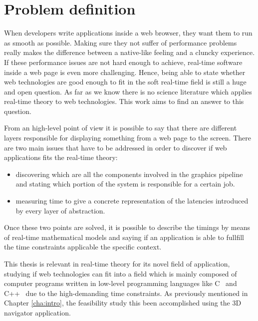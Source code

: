 \chapter{Problem definition} \label{cha:problem_definition}

When developers write applications inside a web browser, they want them to run
as smooth as possible. Making sure they not suffer of performance problems really
makes the difference between a native-like feeling and a cluncky experience.
If these performance issues are not hard enough to achieve, real-time software
inside a web page is even more challenging. Hence, being able to state whether
web technologies are good enough to fit in the soft real-time field is still a
huge and open question. As far as we know there is no science literature which
applies real-time theory to web technologies. This work aims to find an answer
to this question.

From an high-level point of view it is possible to say that there are different
layers responsible for displaying something from a web page to the screen.
There are two main issues that have to be addressed in order to discover if web
applications fits the real-time theory:
\begin{itemize}
    \item discovering which are all the components involved in the graphics
        pipeline and stating which portion of the system is responsible for a
        certain job.
    \item measuring time to give a concrete representation of the latencies
        introduced by every layer of abstraction.
\end{itemize}

Once these two points are solved, it is possible to describe the timings by means
of real-time mathematical models and saying if an application is able to fullfill
the time constraints applicable the specific context.

This thesis is relevant in real-time theory for its novel field of application, studying
if web technologies can fit into a field which is mainly composed of computer
programs written in low-level programming languages like C~\cite{kernighan2006c}
and C++~\cite{stroustrup1995c++} due to the high-demanding time constraints.
As previously mentioned in Chapter \ref{cha:intro}, the feasibility study this
been accomplished using the 3D navigator application.
